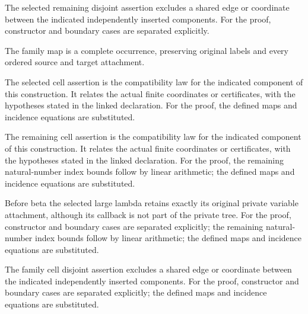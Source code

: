 The selected remaining disjoint assertion excludes a shared edge or coordinate between the indicated independently inserted components.
For the proof, constructor and boundary cases are separated explicitly.
\par{}

The family map is a complete occurrence, preserving original labels and every ordered source and target attachment.
\par{}

The selected cell assertion is the compatibility law for the indicated component of this construction. It relates the actual finite coordinates or certificates, with the hypotheses stated in the linked declaration.
For the proof, the defined maps and incidence equations are substituted.
\par{}

The remaining cell assertion is the compatibility law for the indicated component of this construction. It relates the actual finite coordinates or certificates, with the hypotheses stated in the linked declaration.
For the proof, the remaining natural-number index bounds follow by linear arithmetic; the defined maps and incidence equations are substituted.
\par{}

Before beta the selected large lambda retains exactly its original private variable attachment, although its callback is not part of the private tree.
For the proof, constructor and boundary cases are separated explicitly; the remaining natural-number index bounds follow by linear arithmetic; the defined maps and incidence equations are substituted.
\par{}

The family cell disjoint assertion excludes a shared edge or coordinate between the indicated independently inserted components.
For the proof, constructor and boundary cases are separated explicitly; the defined maps and incidence equations are substituted.
\par{}

